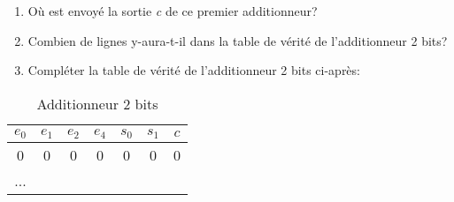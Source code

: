 \documentclass[a4paper,11pt]{article}
\begin{document}
\begin{Form}
\begin{exo}
\begin{enumerate}
\item Où est envoyé la sortie \emph{c} de ce premier additionneur?
\item Combien de lignes y-aura-t-il dans la table de vérité de l'additionneur 2 bits?
\item Compléter la table de vérité de l'additionneur 2 bits ci-après:
\end{enumerate}
\begin{table}[!h]
\begin{center}
\begin{tabular}{|*4{c|}|*3{c|}}
\hline 
$e_0$ & $e_1$ & $e_2$ & $e_4$ & $s_0$ & $s_1$ & $c$ \\ 
\hline 
0 & 0 & 0 & 0 & 0 & 0 & 0 \\ 
\hline 
... &  &  &  &  &  &  \\ 
\hline 
\end{tabular}
\caption{\label{addi}Additionneur 2 bits}
\end{center}
\end{table} 
\end{exo}
\end{Form}
\end{document}
